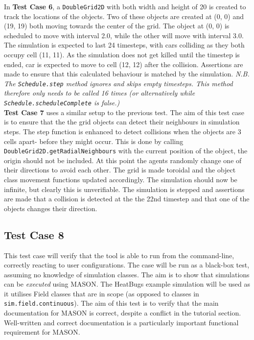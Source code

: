 \documentclass[11pt]{article}
\begin{document}
In \textbf{Test Case 6}, a \texttt{DoubleGrid2D} with both width and height of 20 is created to track the locations of the objects.
Two of these objects are created at (0, 0) and (19, 19) both moving towards the center of the grid.
The object at (0, 0) is scheduled to move with interval 2.0, while the other will move with interval 3.0.
The simulation is expected to last 24 timesteps, with cars colliding as they both occupy cell (11, 11).
As the simulation does not get killed until the timestep is ended, car is expected to move to cell (12, 12) after the collision.
Assertions are made to ensure that this calculated behaviour is matched by the simulation.
\textit{N.B. The \texttt{Schedule.step} method ignores and skips empty timesteps. This method therefore only needs to be called 16 times (or alternatively while \texttt{Schedule.scheduleComplete} is false.)}
\\

\textbf{Test Case 7} uses a similar setup to the previous test.
The aim of this test case is to ensure that the the grid objects can detect their neighbours in simulation steps.
The step function is enhanced to detect collisions when the objects are 3 cells apart- before they might occur.
This is done by calling \texttt{DoubleGrid2D.getRadialNeighbours} with the current position of the object, the origin should not be included.
At this point the agents randomly change one of their directions to avoid each other.
The grid is made toroidal and the object class movement functions updated accordingly.
The simulation should now be infinite, but clearly this is unverifiable.
The simulation is stepped and assertions are made that a collision is detected at the the 22nd timestep and that one of the objects changes their direction.

\subsection{Test Case 8}
This test case will verify that the tool is able to run from the command-line, correctly reacting to user configurations.
The case will be run as a black-box test, assuming no knowledge of simulation classes.
The aim is to show that simulations can be \textit{executed} using MASON.
The HeatBugs example simulation will be used as it utilises Field classes that are in scope (as opposed to classes in \texttt{sim.field.continuous}).
The aim of this test is to verify that the main documentation for MASON is correct, despite a conflict in the tutorial section.
Well-written and correct documentation is a particularly important functional requirement for MASON.
\\
\end{document}
